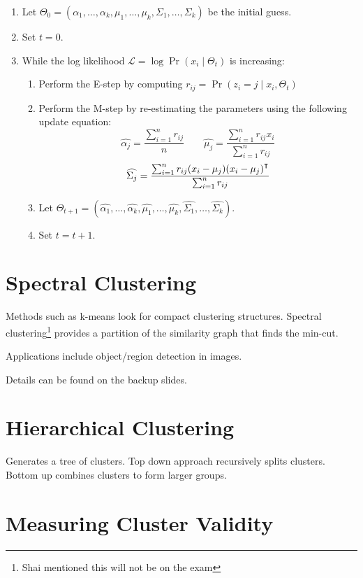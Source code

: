\documentclass{idc_msc}
\renewcommand{\T}{{\mathpalette\raiseT\intercal}} %
\begin{document}
\begin{enumerate}
  \item Let \(\Theta_0 = (\alpha_1, \ldots, \alpha_k, \mu_1, \ldots, \mu_k, \Sigma_1, \ldots, \Sigma_k)\) be the initial guess.
  \item Set \(t = 0\).
  \item While the log likelihood \(\mathcal{L}=\log \Pr(x_i \mid \Theta_t)\) is increasing:
  \begin{enumerate}
    \item Perform the E-step by computing \(r_{ij} = \Pr(z_i = j \mid x_i, \Theta_t)\)
    \item Perform the M-step by re-estimating the parameters using the following update equation:
    \[
    \widehat{\alpha_j} = \frac{\sum_{i=1}^n r_{ij}}{n} \qquad \widehat{\mu_j} = \frac{\sum_{i=1}^n r_{ij}x_i}{\sum_{i=1}^n r_{ij}}
    \]
    \[\widehat{\Sigma_j} = \frac{\sum_{i=1}^n r_{ij} (x_i - \mu_j)(x_i - \mu_j)^\T}{\sum_{i=1}^n r_{ij}}\]
    \item Let \(\Theta_{t+1} = (\widehat{\alpha_1}, \ldots, \widehat{\alpha_k}, \widehat{\mu_1},\ldots,\widehat{\mu_k}, \widehat{\Sigma_1},\ldots,\widehat{\Sigma_k})\).
    \item Set \(t = t + 1\).
  \end{enumerate}
\end{enumerate}

\section{Spectral Clustering}

Methods such as k-means look for compact clustering structures.
Spectral clustering\footnote{Shai mentioned this will not be on the exam} provides a partition of the similarity graph that finds the min-cut.

Applications include object/region detection in images.

Details can be found on the backup slides.

\section{Hierarchical Clustering}

Generates a tree of clusters. Top down approach recursively splits clusters. Bottom up combines clusters to form larger groups.

\section{Measuring Cluster Validity}
\end{document}

